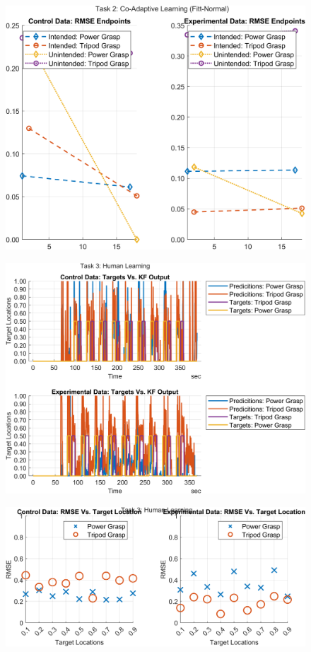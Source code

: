 \documentclass[12pt]{article}
\newcommand\figWidth{7in}
\newcommand\figWidthLarge{7in}
\begin{document}
\begin{figure}
    \includegraphics[width = \figWidth]{t2-spaghetti-fnorm.png}
\end{figure}
\begin{landscape}
    \begin{figure}
        \includegraphics[width = \figWidthLarge]{t3-kf-out.png}
    \end{figure}
\end{landscape}
\begin{figure}
    \includegraphics[width = \figWidth]{t3-rmse-reg.png}
\end{figure}
\end{document}
